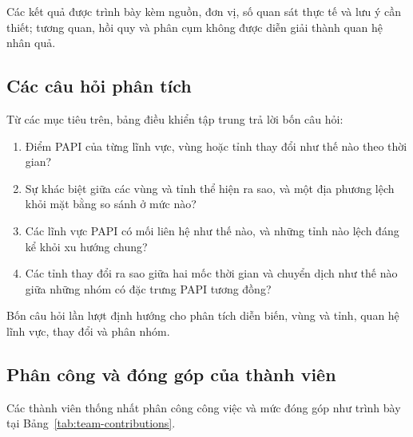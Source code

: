 Các kết quả được trình bày kèm nguồn, đơn vị, số quan sát thực tế và lưu ý cần thiết; tương quan, hồi quy và phân cụm không được diễn giải thành quan hệ nhân quả.

\subsection{Các câu hỏi phân tích}

Từ các mục tiêu trên, bảng điều khiển tập trung trả lời bốn câu hỏi:

\begin{enumerate}
    \item Điểm PAPI của từng lĩnh vực, vùng hoặc tỉnh thay đổi như thế nào theo thời gian?
    \item Sự khác biệt giữa các vùng và tỉnh thể hiện ra sao, và một địa phương lệch khỏi mặt bằng so sánh ở mức nào?
    \item Các lĩnh vực PAPI có mối liên hệ như thế nào, và những tỉnh nào lệch đáng kể khỏi xu hướng chung?
    \item Các tỉnh thay đổi ra sao giữa hai mốc thời gian và chuyển dịch như thế nào giữa những nhóm có đặc trưng PAPI tương đồng?
\end{enumerate}

Bốn câu hỏi lần lượt định hướng cho phân tích diễn biến, vùng và tỉnh, quan hệ lĩnh vực, thay đổi và phân nhóm.

\subsection{Phân công và đóng góp của thành viên}

Các thành viên thống nhất phân công công việc và mức đóng góp như trình bày tại Bảng~\ref{tab:team-contributions}.

